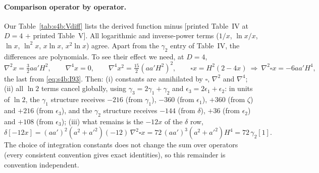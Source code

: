 \documentclass[aps,prd,onecolumn,10pt,nofootinbib,floatfix]{revtex4-2}
\begin{document}
\paragraph*{Comparison operator by operator.}
Our Table~\ref{tab:s4b:Vdiff} lists the derived function minus [printed Table~IV at $D=4$ $+$ printed Table~V]. All
logarithmic and inverse-power terms ($1/x$, $\ln x/x$, $\ln x$, $\ln^2x$, $x\ln x$, $x^2\ln x$) agree. Apart from
the $\gamma_2$ entry of Table~IV, the differences are polynomials. To see their effect we need, at $D=4$,
\begin{equation}
\nabla^2x=\tfrac32aa'H^2,\qquad \nabla^4x=0,\qquad \nabla^4x^2=\tfrac{15}{2}(aa'H^2)^2,\qquad
\square x=H^2(2-4x)\ \Rightarrow\ \nabla^2\square x=-6aa'H^4,
\label{eq:s4b:polyops}
\end{equation}
the last from \eqref{eq:s4b:I93}. Then:
(i) constants are annihilated by $\square$, $\nabla^2$ and $\nabla^4$;
(ii) all $\ln2$ terms cancel globally, using $\gamma_3=2\gamma_1+\gamma_2$ and $\epsilon_3=2\epsilon_1+\epsilon_2$: in units
of $\ln2$, the $\gamma_1$ structure receives $-216$ (from $\gamma_1$), $-360$ (from $\epsilon_1$), $+360$ (from $\zeta$) and
$+216$ (from $\epsilon_3$), and the $\gamma_2$ structure receives $-144$ (from $\delta$), $+36$ (from $\epsilon_2$) and
$+108$ (from $\epsilon_3$);
(iii) what remains is the $-12x$ of the $\delta$ row,
\begin{equation}
\delta[-12x]=(aa')^2(a^2+a'^2)(-12)\,\nabla^2\square x=72\,(aa')^3(a^2+a'^2)H^4=72\,\gamma_2[1].
\label{eq:s4b:72g2}
\end{equation}
The choice of integration constants does not change the sum over operators (every consistent convention gives exact
identities), so this remainder is convention independent.
\end{document}
